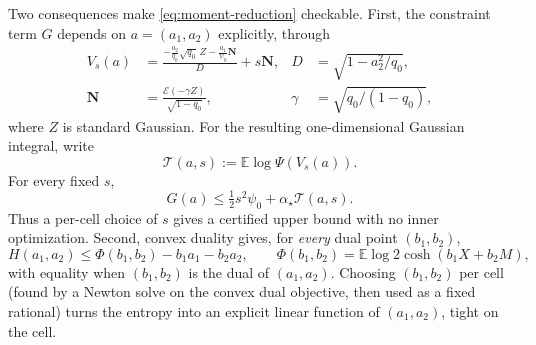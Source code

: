 \documentclass[11pt]{article}
\newcommand{\bN}{\mathbf{N}}
\newcommand{\E}{\mathbb{E}}
\newcommand{\cE}{\mathcal{E}}
\begin{document}
Two consequences make \eqref{eq:moment-reduction} checkable. First, the
constraint term $G$ depends on $a=(a_1,a_2)$ explicitly, through
\[
 \begin{aligned}
 V_s(a)&=
 \frac{-\frac{a_2}{q_0}\sqrt{q_0}\,Z
       -\frac{a_1}{\psi_0}\bN}{D}+s\bN,
 &D&=\sqrt{1-a_2^2/q_0},\\
 \bN&=\frac{\cE(-\gamma Z)}{\sqrt{1-q_0}},
 &\gamma&=\sqrt{q_0/(1-q_0)},
 \end{aligned}
\]
where $Z$ is standard Gaussian.  For the resulting one-dimensional Gaussian
integral, write
\[
 \mathcal T(a,s):=\E\log\Psi(V_s(a)).
\]
For every fixed $s$,
\[
 G(a)\le \tfrac12 s^2\psi_0 + \alpha_\star\mathcal T(a,s).
\]
Thus a per-cell choice of $s$ gives a certified upper bound with no inner
optimization. Second, convex duality gives, for \emph{every} dual point
$(b_1,b_2)$,
\begin{equation}\label{eq:dual-bound}
  H(a_1,a_2) \le \Phi(b_1,b_2) - b_1 a_1 - b_2 a_2,
  \qquad \Phi(b_1,b_2) = \E\log 2\cosh(b_1 X + b_2 M),
\end{equation}
with equality when $(b_1,b_2)$ is the dual of $(a_1,a_2)$. Choosing $(b_1,b_2)$
per cell (found by a Newton solve on the convex dual objective, then used as a
fixed rational) turns the entropy into an explicit linear function of
$(a_1,a_2)$, tight on the cell.
\end{document}
